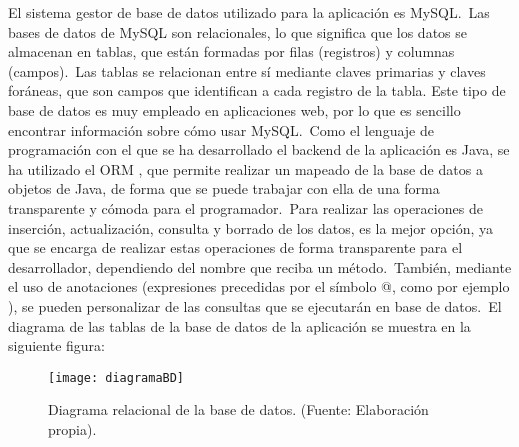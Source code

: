
El sistema gestor de base de datos utilizado para la aplicación es MySQL.\ Las bases de datos de MySQL son
relacionales, lo que significa que los datos se almacenan en tablas, que están formadas por filas (registros) y columnas
(campos).\ Las tablas se relacionan entre sí mediante claves primarias y claves foráneas, que son campos que
identifican a cada registro de la tabla.
Este tipo de base de datos es muy empleado en aplicaciones web, por lo que es sencillo encontrar información sobre
cómo usar MySQL\@.\ Como el lenguaje de programación con el que se ha desarrollado el backend de la aplicación es
Java, se ha utilizado el ORM , que permite realizar un mapeado de la base de datos a objetos de
Java, de forma que se puede trabajar con ella de una forma transparente y cómoda para el programador.\ Para realizar
las operaciones de inserción, actualización, consulta y borrado de los datos,  es la
mejor opción, ya que se encarga de realizar estas operaciones de forma transparente para el desarrollador,
dependiendo del nombre que reciba un método.\ También, mediante el uso de anotaciones (expresiones precedidas por el
símbolo @, como por ejemplo ), se pueden personalizar de las consultas que se ejecutarán en base de
datos.\ El diagrama de las tablas de la base de datos de la aplicación se muestra en la siguiente figura:

\begin{figure}[H]
	\centering
	\texttt{[image: diagramaBD]}
	\caption{Diagrama relacional de la base de datos. (Fuente: Elaboración propia).}
	\label{fig:diagrama-tablas}
\end{figure}
